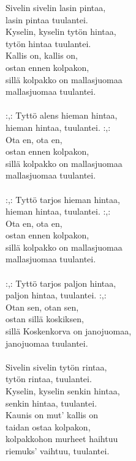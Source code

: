
            Sivelin sivelin lasin pintaa,  \\
            lasin pintaa tuulantei.  \\
            Kyselin, kyselin tytön hintaa,  \\
            tytön hintaa tuulantei.  \\
            Kallis on, kallis on,  \\
            ostan ennen kolpakon,  \\
            sillä kolpakko on mallasjuomaa  \\
            mallasjuomaa tuulantei. \\
\hspace{10mm} \\
            :,: Tyttö alens hieman hintaa,  \\
            hieman hintaa, tuulantei. :,:  \\
            Ota en, ota en,  \\
            ostan ennen kolpakon,  \\
            sillä kolpakko on mallasjuomaa  \\
            mallasjuomaa tuulantei. \\
\hspace{10mm} \\
            :,: Tyttö tarjos hieman hintaa,  \\
            hieman hintaa, tuulantei. :,: \\
            Ota en, ota en,  \\
            ostan ennen kolpakon,  \\
            sillä kolpakko on mallasjuomaa  \\
            mallasjuomaa tuulantei. \\
\hspace{10mm} \\
            :,: Tyttö tarjos paljon hintaa,  \\
            paljon hintaa, tuulantei. :,:  \\
            Otan sen, otan sen,  \\
            ostan sillä koskiksen,  \\
            sillä Koskenkorva on janojuomaa,  \\
            janojuomaa tuulantei. \\
\hspace{10mm} \\
            Sivelin sivelin tytön rintaa,  \\
            tytön rintaa, tuulantei.  \\
            Kyselin, kyselin senkin hintaa,  \\
            senkin hintaa, tuulantei.  \\
            Kaunis on mut' kallis on  \\
            taidan ostaa kolpakon,  \\
            kolpakkohon murheet haihtuu  \\
            riemuks' vaihtuu, tuulantei. \\
